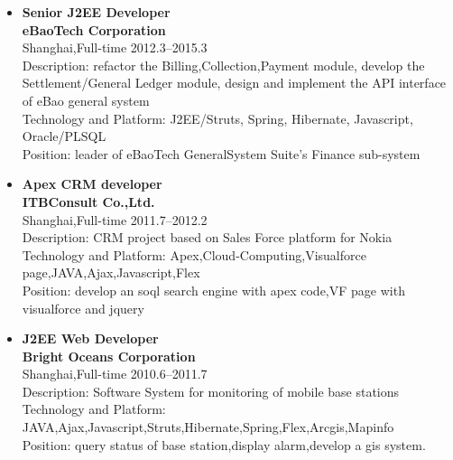 \documentclass[a4paper,11pt]{res}
\begin{document}
\begin{resume}
\begin{itemize}
  \item{\bf Senior J2EE Developer}\\ {\bf eBaoTech Corporation}\\ Shanghai,Full-time \hfill 2012.3--2015.3\\
    Description: refactor the Billing,Collection,Payment module,
    develop the Settlement/General Ledger module, design and
    implement the API interface of eBao general system \\
    Technology and Platform: J2EE/Struts, Spring, Hibernate, Javascript, Oracle/PLSQL \\
    Position: leader of eBaoTech GeneralSystem Suite's Finance
    sub-system \\

  \item{\bf Apex CRM developer}\\ {\bf ITBConsult Co.,Ltd.}\\ Shanghai,Full-time \hfill 2011.7--2012.2\\
    Description: CRM project based on Sales Force platform for Nokia\\
    Technology and Platform: Apex,Cloud-Computing,Visualforce page,JAVA,Ajax,Javascript,Flex \\
    Position: develop an soql search engine with apex code,VF page with visualforce and jquery\\
    
  \item{\bf J2EE Web Developer}\\ {\bf Bright Oceans Corporation}\\ Shanghai,Full-time \hfill 2010.6--2011.7\\
    Description: Software System for monitoring of mobile base stations\\
    Technology and Platform: JAVA,Ajax,Javascript,Struts,Hibernate,Spring,Flex,Arcgis,Mapinfo\\
    Position: query status of base station,display alarm,develop a gis system.\\
  \end{itemize}


\end{resume}
\end{document}
